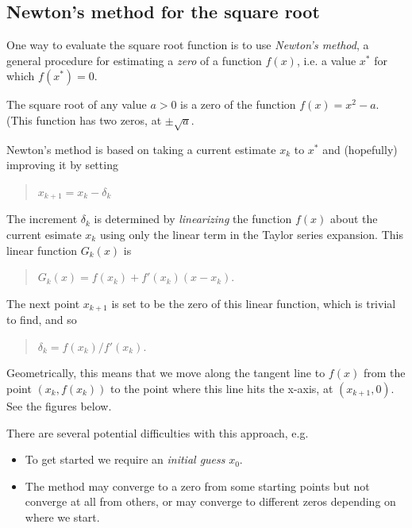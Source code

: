 \documentclass[letterpaper,10pt,english]{sphinxmanual}
\begin{document}
\subsection{Newton's method for the square root}
\label{special_functions:newton-s-method-for-the-square-root}\label{special_functions:special-newton}
One way to evaluate the square root function is to use \emph{Newton's method}, a
general procedure for estimating a \emph{zero} of a function $f(x)$, i.e. a
value $x^*$ for which $f(x^*) = 0$.

The square root of any value $a>0$ is a zero of the function $f(x)
= x^2 - a$.  (This function has two zeros, at $\pm\sqrt{a}$.

Newton's method is based on taking a current estimate $x_k$ to
$x^*$ and (hopefully) improving it by setting
\begin{quote}

$x_{k+1} = x_k - \delta_k$
\end{quote}

The increment $\delta_k$ is determined by \emph{linearizing} the function
$f(x)$ about the current esimate $x_k$ using only the linear
term in the Taylor series expansion.  This linear function $G_k(x)$ is
\begin{quote}

$G_k(x) = f(x_k) + f'(x_k)(x-x_k)$.
\end{quote}

The next point $x_{k+1}$ is set to be the zero of this linear
function, which is trivial to find, and so
\begin{quote}

$\delta_k = f(x_k) / f'(x_k)$.
\end{quote}

Geometrically, this means that we move along the tangent line to
$f(x)$ from the point $(x_k,f(x_k))$ to the point where this
line hits the x-axis, at $(x_{k+1}, 0)$.  See the figures below.

There are several potential difficulties with this approach, e.g.
\begin{itemize}
\item {} 
To get started we require an \emph{initial guess} $x_0$.

\item {} 
The method may converge to a zero from some starting points but not
converge at all from others, or may converge to different zeros depending
on where we start.

\end{itemize}
\end{document}
